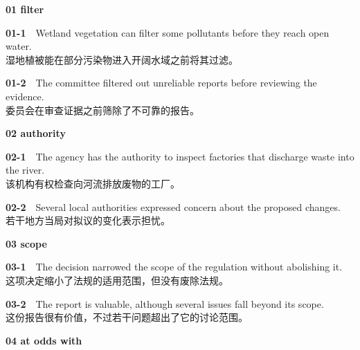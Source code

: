 \documentclass[a4paper,11pt,openany]{report}
\newcommand{\zhline}[1]{{\CJKsf\color{bodygrey}#1}}
\begin{document}
\textbf{01 filter}

\begin{samepage}
\textbf{01-1}　Wetland vegetation can filter some pollutants before they reach open water.\\
\zhline{湿地植被能在部分污染物进入开阔水域之前将其过滤。}
\par\end{samepage}

\begin{samepage}
\textbf{01-2}　The committee filtered out unreliable reports before reviewing the evidence.\\
\zhline{委员会在审查证据之前筛除了不可靠的报告。}
\par\end{samepage}

\textbf{02 authority}

\begin{samepage}
\textbf{02-1}　The agency has the authority to inspect factories that discharge waste into the river.\\
\zhline{该机构有权检查向河流排放废物的工厂。}
\par\end{samepage}

\begin{samepage}
\textbf{02-2}　Several local authorities expressed concern about the proposed changes.\\
\zhline{若干地方当局对拟议的变化表示担忧。}
\par\end{samepage}

\textbf{03 scope}

\begin{samepage}
\textbf{03-1}　The decision narrowed the scope of the regulation without abolishing it.\\
\zhline{这项决定缩小了法规的适用范围，但没有废除法规。}
\par\end{samepage}

\begin{samepage}
\textbf{03-2}　The report is valuable, although several issues fall beyond its scope.\\
\zhline{这份报告很有价值，不过若干问题超出了它的讨论范围。}
\par\end{samepage}

\textbf{04 at odds with}
\end{document}
